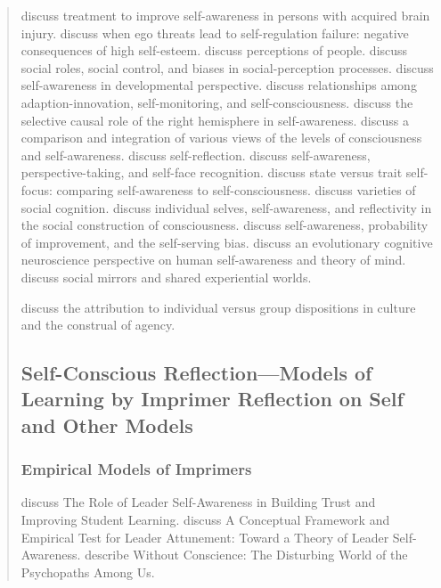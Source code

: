 \begin{quotation}
\cite{goverover2007tis} discuss treatment to improve self-awareness in persons with acquired brain injury.
\cite{baumeister1993etl} discuss when ego threats lead to self-regulation failure: negative consequences of high self-esteem.
\cite{gilbert2005ocb} discuss perceptions of people.
\cite{ross2005bispc} discuss social roles, social control, and biases in social-perception processes.
\cite{hobson2006sad} discuss self-awareness in developmental perspective.
\cite{hutchinson2007saa} discuss relationships among adaption-innovation, self-monitoring, and self-consciousness.
\cite{keenan2007crr} discuss the selective causal role of the right hemisphere in self-awareness.
\cite{morin2004lca} discuss a comparison and integration of various views of the levels of consciousness and self-awareness.
\cite{silverman2008osr} discuss self-reflection.
\cite{smith2007sap} discuss self-awareness, perspective-taking, and self-face recognition.
\cite{soeiro2008svtsf} discuss state versus trait self-focus: comparing self-awareness to self-consciousness.
\cite{uhlmann2008vsc} discuss varieties of social cognition.
\cite{burns1998scc} discuss individual selves, self-awareness, and reflectivity in the social construction of consciousness.
\cite{duval2002sap} discuss self-awareness, probability of improvement, and the self-serving bias.
\cite{focquaert2008ecn} discuss an evolutionary cognitive neuroscience perspective on human self-awareness and theory of mind.
\cite{whitehead2001sma} discuss social mirrors and shared experiential worlds.


\cite{menon2005cacoa} discuss the attribution to individual versus group dispositions in culture and the construal of agency.

\subsection{Self-Conscious Reflection---Models of Learning by Imprimer Reflection on Self and Other Models}

\subsubsection{Empirical Models of Imprimers}

\cite{hinton2008rlsa} discuss The Role of Leader Self-Awareness in Building Trust and Improving Student Learning.
\cite{taylor2007cfetla} discuss A Conceptual Framework and Empirical Test for Leader Attunement: Toward a Theory of Leader Self-Awareness.
\cite{hare1993wc} describe Without Conscience: The Disturbing World of the Psychopaths Among Us.


\end{quotation}
